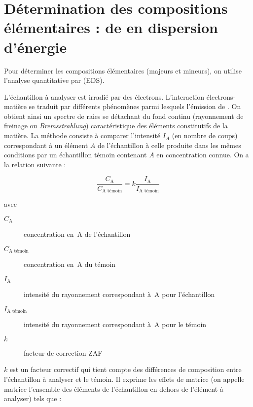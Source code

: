 \section{Détermination des compositions élémentaires : \spectro de 
         \RX en dispersion d'énergie}

Pour déterminer les compositions élémentaires (majeurs et mineurs), 
on utilise l'analyse quantitative par \EDS (EDS).

L'échantillon à analyser est irradié par des électrons. L'interaction 
électrons-matière se traduit par différents phénomènes parmi lesquels 
l'émission de \RX. On obtient ainsi un spectre de raies se détachant 
du fond continu (rayonnement de freinage ou \emph{Bremsstrahlung}) 
caractéristique des éléments constitutifs de la matière. La méthode 
consiste à comparer l'intensité $I_A$ (en nombre de coups) 
correspondant à un élément $A$ de l'échantillon à celle produite 
dans les mêmes conditions par un échantillon témoin contenant $A$ 
en concentration connue. On a la relation suivante :

\begin{equation*}
  \frac{C_\text{A}}{C_\text{A témoin}} = 
                      k \frac{I_\text{A}}{I_\text{A témoin}}
\end{equation*}


avec%
\begin{description}
  \item [$C_\text{A}$] concentration en~A de l'échantillon
  \item [$C_\text{A témoin}$] concentration en~A du témoin
  \item [$I_\text{A}$] intensité du rayonnement correspondant à~A pour 
        l'échantillon
  \item [$I_\text{A témoin}$] intensité du rayonnement correspondant 
        à~A pour le témoin
  \item [$k$] facteur de correction ZAF
\end{description}

$k$ est un facteur correctif qui tient compte des différences de 
composition entre l'échantillon à analyser et le témoin. Il exprime 
les effets de matrice (on appelle matrice l'ensemble des éléments de 
l'échantillon en dehors de l'élément à analyser) tels que :

